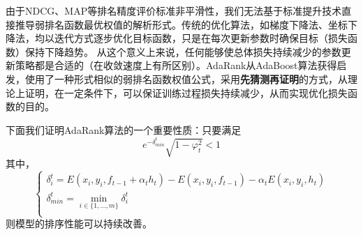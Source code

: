 由于NDCG、MAP等排名精度评价标准非平滑性，我们无法基于标准提升技术直接推导弱排名函数最优权值的解析形式。传统的优化算法，如梯度下降法、坐标下降法，均以迭代方式逐步优化目标函数，只是在每次更新参数时确保目标（损失函数）保持下降趋势\cite{xu2007adarank}。
从这个意义上来说，任何能够使总体损失持续减少的参数更新策略都是合适的（在收敛速度上有所区别）。AdaRank从AdaBoost算法获得启发，使用了一种形式相似的弱排名函数权值公式，采用\textbf{先猜测再证明}的方式，从理论上证明，在一定条件下，可以保证训练过程损失持续减少，从而实现优化损失函数的目的。

下面我们证明AdaRank算法的一个重要性质：只要满足
\begin{equation}
    e^{-\delta_{min}^t} \sqrt{1-\varphi_t^2} < 1
\end{equation}
其中，
\[
    \left\{
    \begin{array}{l}
      \delta_i^t = E(x_i, y_i, f_{t-1} + \alpha_t h_t) - E(x_i, y_i, f_{t-1}) - \alpha_t E(x_i, y_i, h_t)\\
      \delta_{min}^t = \min\limits_{i\in\{1,\ldots,m\}} \delta_i^t \\
    \end{array}
    \right.
\]
则模型的排序性能可以持续改善。

